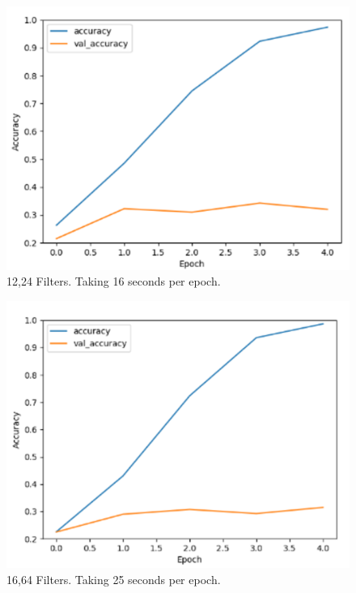 \begin{figure}[H]
\centering
\includegraphics[scale=1.0]{Media/Testing/fig7.png}
\caption{12,24 Filters. Taking 16 seconds per epoch.}
\label{fig7}
\end{figure}

\begin{figure}[H]
\centering
\includegraphics[scale=1.0]{Media/Testing/fig8.png}
\caption{16,64 Filters. Taking 25 seconds per epoch.}
\label{fig8}
\end{figure}

